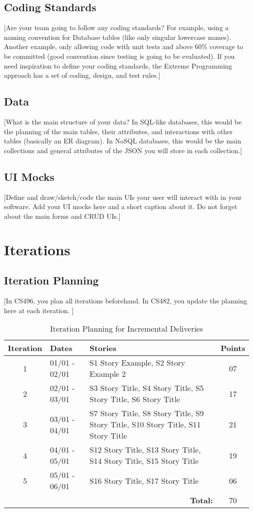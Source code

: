 \documentclass{article}
\begin{document}
\subsection{Coding Standards}
[Are your team going to follow any coding standards? For example, using a naming convention for Database tables (like only singular lowercase names). Another example, only allowing code with unit tests and above 60\% coverage to be committed (good convention since testing is going to be evaluated). If you need inspiration to define your coding standards, the Extreme Programming approach has a set of coding, design, and test rules.]

\subsection{Data}
[What is the main structure of your data? In SQL-like databases, this would be the planning of the main tables, their attributes, and interactions with other tables (basically an ER diagram). In NoSQL databases, this would be the main collections and general attributes of the JSON you will store in each collection.]

\subsection{UI Mocks}
[Define and draw/sketch/code the main UIs your user will interact with in your software. Add your UI mocks here and a short caption about it. Do not forget about the main forms and CRUD UIs.]


\section{Iterations}

\subsection{Iteration Planning}
[In CS496, you plan all iterations beforehand. In CS482, you update the planning here at each iteration. ]

\begin{table}[h!]
\centering
\begin{tabular}{c l p{7cm} c}
\hline
\textbf{Iteration} & \textbf{Dates} & \textbf{Stories} & \textbf{Points} \\
\hline
1 & 01/01 - 02/01 & S1 Story Example, S2 Story Example 2 & 07 \\ \hline
2 & 02/01 - 03/01 & S3 Story Title, S4 Story Title, S5 Story Title, S6 Story Title & 17 \\ \hline
3 & 03/01 - 04/01 & S7 Story Title, S8 Story Title, S9 Story Title, S10 Story Title, S11 Story Title & 21 \\ \hline
4 & 04/01 - 05/01 & S12 Story Title, S13 Story Title, S14 Story Title, S15 Story Title & 19 \\ \hline
5 & 05/01 - 06/01 & S16 Story Title, S17 Story Title & 06 \\ \hline
\multicolumn{3}{r}{\bf Total: } & 70 \\ \hline
\end{tabular}
\caption{Iteration Planning for Incremental Deliveries}
\end{table}
\end{document}
